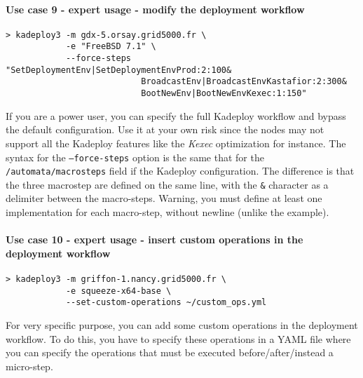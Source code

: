 \documentclass[a4wide,10pt,oneside]{book}
\newcommand{\ypath}[1]{\texttt{#1}}
\begin{document}
\paragraph{Use case 9 - expert usage - modify the deployment workflow}
\begin{verbatim}
> kadeploy3 -m gdx-5.orsay.grid5000.fr \
            -e "FreeBSD 7.1" \
            --force-steps "SetDeploymentEnv|SetDeploymentEnvProd:2:100&
                           BroadcastEnv|BroadcastEnvKastafior:2:300&
                           BootNewEnv|BootNewEnvKexec:1:150"
\end{verbatim}
If you are a power user, you can specify the full Kadeploy workflow and bypass the default configuration. Use it at your own risk since the nodes may not support all the Kadeploy features like the \textit{Kexec} optimization for instance. The syntax for the \texttt{--force-steps} option is the same that for the \ypath{/automata/macrosteps} field if the Kadeploy configuration. The difference is that the three macrostep are defined on the same line, with the \texttt{\&} character as a delimiter between the macro-steps. Warning, you must define at least one implementation for each macro-step, without newline (unlike the example).

\paragraph{Use case 10 - expert usage - insert custom operations in the deployment workflow}
\begin{verbatim}
> kadeploy3 -m griffon-1.nancy.grid5000.fr \
            -e squeeze-x64-base \
            --set-custom-operations ~/custom_ops.yml
\end{verbatim}
For very specific purpose, you can add some custom operations in the deployment workflow. To do this, you have to specify these operations in a YAML file where you can specify the operations that must be executed before/after/instead a micro-step.
\end{document}
